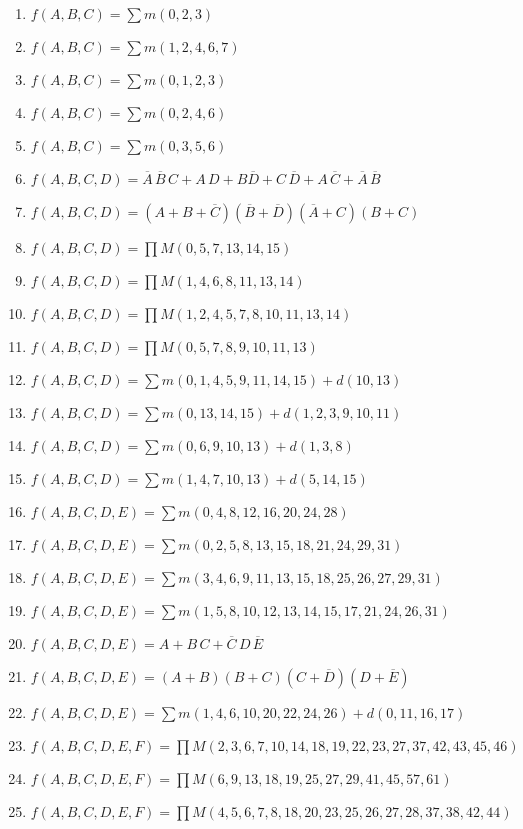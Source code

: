 \documentclass[a4paper,10pt]{article}
\begin{document}

\begin{center}
\large{}
\end{center}

\begin{enumerate}
 \item $f(A,B,C)=\sum{} m(0,2,3)$
 \item $f(A,B,C)=\sum{} m(1,2,4,6,7)$
 \item $f(A,B,C)=\sum{} m(0,1,2,3)$
 \item $f(A,B,C)=\sum{} m(0,2,4,6)$
 \item $f(A,B,C)=\sum{} m(0,3,5,6)$
 
 \item $f(A,B,C,D)=\overline{A}\,\overline{B}\,C+A\,D+B\overline{D}+C\,\overline{D}+A\,\overline{C}+\overline{A}\,\overline{B}$
 \item $f(A,B,C,D)=(A+B+\overline{C})(\overline{B}+\overline{D})(\overline{A}+C)(B+C)$
 \item $f(A,B,C,D)=\prod{} M(0,5,7,13,14,15)$
 \item $f(A,B,C,D)=\prod{} M(1,4,6,8,11,13,14)$
 \item $f(A,B,C,D)=\prod{} M(1,2,4,5,7,8,10,11,13,14)$
 \item $f(A,B,C,D)=\prod{} M(0,5,7,8,9,10,11,13)$
 \item $f(A,B,C,D)=\sum{} m(0,1,4,5,9,11,14,15)+d(10,13)$
 \item $f(A,B,C,D)=\sum{} m(0,13,14,15)+d(1,2,3,9,10,11)$
 \item $f(A,B,C,D)=\sum{} m(0,6,9,10,13)+d(1,3,8)$
 \item $f(A,B,C,D)=\sum{} m(1,4,7,10,13)+d(5,14,15)$
 
 
 
 
 
 \item $f(A,B,C,D,E)=\sum{} m(0,4,8,12,16,20,24,28)$
 \item $f(A,B,C,D,E)=\sum{} m(0,2,5,8,13,15,18,21,24,29,31)$
 \item $f(A,B,C,D,E)=\sum{} m(3,4,6,9,11,13,15,18,25,26,27,29,31)$
 \item $f(A,B,C,D,E)=\sum{} m(1,5,8,10,12,13,14,15,17,21,24,26,31)$
 \item $f(A,B,C,D,E)=A+B\,C+\overline{C}\,D\,\overline{E}$
 \item $f(A,B,C,D,E)=(A+B)(B+C)(C+\overline{D})(D+\overline{E})$
 \item $f(A,B,C,D,E)=\sum{} m(1,4,6,10,20,22,24,26)+d(0,11,16,17)$
 
 \item $f(A,B,C,D,E,F)=\prod{} M(2,3,6,7,10,14,18,19,22,23,27,37,42,43,45,46)$
 \item $f(A,B,C,D,E,F)=\prod{} M(6,9,13,18,19,25,27,29,41,45,57,61)$
 \item $f(A,B,C,D,E,F)=\prod{} M(4,5,6,7,8,18,20,23,25,26,27,28,37,38,42,44)$
 
 
 

 
 
 
 
 
 
 
\end{enumerate}
\end{document}
